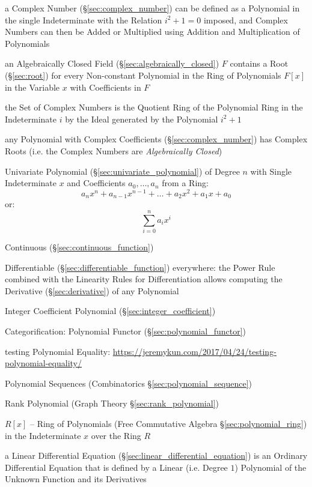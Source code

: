 a Complex Number (\S\ref{sec:complex_number}) can be defined as a Polynomial in
the single Indeterminate with the Relation $i^2 + 1 = 0$ imposed, and Complex
Numbers can then be Added or Multiplied using Addition and Multiplication of
Polynomials

an Algebraically Closed Field (\S\ref{sec:algebraically_closed}) $F$ contains a
Root (\S\ref{sec:root}) for every Non-constant Polynomial in the Ring
of Polynomials $F[x]$ in the Variable $x$ with
Coefficients in $F$

the Set of Complex Numbers is the Quotient Ring of the Polynomial Ring in the
Indeterminate $i$ by the Ideal generated by the Polynomial $i^2 + 1$

any Polynomial with Complex Coefficients (\S\ref{sec:complex_number}) has
Complex Roots (i.e. the Complex Numbers are \emph{Algebraically Closed})

Univariate Polynomial (\S\ref{sec:univariate_polynomial}) of Degree
$n$ with Single Indeterminate $x$ and Coefficients $a_0, \ldots, a_n$
from a Ring:
\[
  a_n x^n + a_{n-1} x^{n-1} + \ldots + a_2 x^2 + a_1 x + a_0
\]
or:
\[
  \sum_{i=0}^n a_i x^i
\]

Continuous (\S\ref{sec:continuous_function})

Differentiable (\S\ref{sec:differentiable_function}) everywhere: the Power Rule
combined with the Linearity Rules for Differentiation allows computing the
Derivative (\S\ref{sec:derivative}) of any Polynomial

Integer Coefficient Polynomial (\S\ref{sec:integer_coefficient})

Categorification: Polynomial Functor (\S\ref{sec:polynomial_functor})

testing Polynomial Equality:
\url{https://jeremykun.com/2017/04/24/testing-polynomial-equality/}

\fist Polynomial Sequences (Combinatorics \S\ref{sec:polynomial_sequence})

\fist Rank Polynomial (Graph Theory \S\ref{sec:rank_polynomial})

$R[x]$ -- Ring of Polynomials (Free Commutative Algebra
\S\ref{sec:polynomial_ring}) in the Indeterminate $x$ over the Ring $R$

a Linear Differential Equation (\S\ref{sec:linear_differential_equation}) is an
Ordinary Differential Equation that is defined by a Linear (i.e. Degree $1$)
Polynomial of the Unknown Function and its Derivatives



